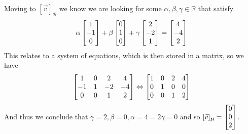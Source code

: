 \documentclass[11pt]{book}
\begin{document}
\begin{enumerate}
\begin{enumerate}
                Moving to $\left[ \vec{v} \right]_{\mathcal{B}}$ we know we are looking for some $\alpha , \beta , \gamma \in \mathbb{R}$ that satisfy
                \begin{equation*}
                    \alpha \begin{bmatrix} 1 \\ -1 \\ 0 \end{bmatrix} + \beta \begin{bmatrix} 0 \\ 1 \\ 0 \end{bmatrix} + \gamma \begin{bmatrix} 2 \\ -2 \\ 1 \end{bmatrix} = \begin{bmatrix} 4 \\ -4 \\ 2 \end{bmatrix}
                \end{equation*}
                This relates to a system of equations, which is then stored in a matrix, so we have
                \begin{equation*}
                    \begin{bmatrix} 1 & 0 & 2 & 4 \\ -1 & 1 & -2 & -4 \\ 0 & 0 & 1 & 2 \end{bmatrix} \Leftrightarrow \begin{bmatrix} 1 & 0 & 2 & 4 \\ 0 & 1 & 0 & 0 \\ 0 & 0 & 1 & 2 \end{bmatrix}
                \end{equation*}
                And thus we conclude that $\gamma = 2 ,\beta = 0, \alpha = 4 = 2 \gamma  = 0$ and so $\left[ \vec{v} \right]_{\mathcal{B}} = \begin{bmatrix} 0 \\ 0 \\ 2 \end{bmatrix}$. 


\end{enumerate}
\end{enumerate}
\end{document}
